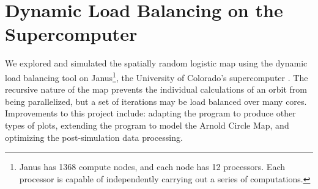\section{Dynamic Load Balancing on the Supercomputer}
We explored and simulated the spatially random logistic map using the
dynamic load balancing tool on Janus\footnote{Janus has 1368 compute nodes, and
  each node has 12 processors. Each processor is capable of
  independently carrying
  out a series of computations.}, the University of Colorado's supercomputer
\cite{janus}. The recursive nature of the map prevents the individual
calculations of an orbit from being parallelized, but a set of
iterations may be load balanced over many
cores. Improvements to this project include: adapting the program to
produce other types of plots, extending the program to model
the Arnold Circle Map, and optimizing the post-simulation data processing. 

